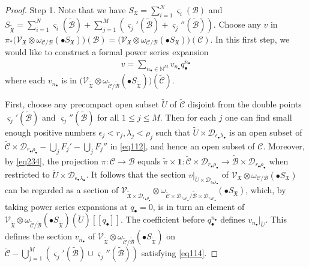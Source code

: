 \documentclass[12pt,b5paper,notitlepage]{report}
\theoremstyle{definition}
\theoremstyle{plain}
\newcommand{\fk}{\mathfrak}
\newcommand{\mc}{\mathcal}
\newcommand{\wtd}{\widetilde}
\newcommand{\id}{\mathbf{1}}
\newcommand{\scr}{\mathscr}
\newcommand{\sgm}{\varsigma}
\newcommand{\blt}{\bullet}
\newcommand{\Nbb}{\mathbb N}
\numberwithin{equation}{section}
\begin{document}
\begin{proof}
Step 1. Note that we have $S_{\fk X}=\sum_{i=1}^N\sgm_i(\mc B)$ and $S_{\wtd{\fk X}}=\sum_{i=1}^N\sgm_i(\wtd{\mc B})+\sum_{j=1}^M(\sgm_j'(\wtd{\mc B})+\sgm_j''(\wtd{\mc B}))$. Choose any $v$ in $\pi_*\big(\scr V_{\fk X}\otimes\omega_{\mc C/\mc B}(\blt S_{\fk X})\big)(\mc B)=\big(\scr V_{\fk X}\otimes\omega_{\mc C/\mc B}(\blt S_{\fk X})\big)(\mc C)$.  In this first step, we would like to construct a formal power series expansion
\begin{align}
v=\sum_{n_\blt\in\Nbb^M}v_{n_\blt}q_\blt^{n_\blt}\label{eq114}
\end{align}
where each $v_{n_\blt}$ is in $\big(\scr V_{\wtd{\fk X}}\otimes\omega_{\wtd{\mc C}/\wtd{\mc B}}(\blt S_{\wtd{\fk X}})\big)(\wtd{\mc C})$.  

First, choose any precompact open subset $\wtd U$ of $\wtd{\mc C}$ disjoint from the double points $\sgm_j'(\wtd{\mc B})$ and $\sgm_j''(\wtd{\mc B})$ for all $1\leq j\leq M$. Then for each $j$ one can find small enough positive numbers $\epsilon_j<r_j,\lambda_j<\rho_j$  such that $\wtd U\times\mc D_{\epsilon_\blt\lambda_\blt}$ is an open subset of  $\wtd {\mc C}\times\mc D_{r_\blt\rho_\blt}-\bigcup_j F_j'-\bigcup_j F_j''$ in \eqref{eq112}, and hence an open subset of $\mc C$.   Moreover, by \eqref{eq234}, the projection $\pi:\mc C\rightarrow\mc B$ equals $\wtd \pi\times \id:\wtd {\mc C}\times\mc D_{r_\blt\rho_\blt}\rightarrow \wtd{\mc B}\times \mc D_{r_\blt\rho_\blt}$ when restricted to  $\wtd U\times \mc D_{\epsilon_\blt\lambda_\blt}$. It follows that the section $v|_{\wtd U\times \mc D_{\epsilon_\blt\lambda_\blt}}$  of $\scr V_{\fk X}\otimes\omega_{\mc C/\mc B}(\blt S_{\fk X})$ can be regarded as a section of $\scr V_{\wtd{\fk X}\times\mc D_{r_\blt\rho_\blt}}\otimes\omega_{\wtd{\mc C}\times\mc D_{r_\blt\rho_\blt}/\wtd{\mc B}\times\mc D_{r_\blt\rho_\blt}}(\blt S_{\fk X})$, which, by taking power series expansions at $q_\blt=0$, is in turn an element of $\scr V_{\wtd{\fk X}}\otimes\omega_{\wtd{\mc C}/\wtd{\mc B}}(\blt S_{\wtd{\fk X}})(\wtd U)[[q_\blt]]$. The coefficient before $q_\blt^{n_\blt}$ defines $v_{n_\blt}|_{\wtd U}$. This defines the section $v_{n_\blt}$ of $\scr V_{\wtd{\fk X}}\otimes\omega_{\wtd{\mc C}/\wtd{\mc B}}(\blt S_{\wtd{\fk X}})$ on $\wtd{\mc C}-\bigcup_{j=1}^M(\sgm_j'(\wtd{\mc B})\cup \sgm_j''(\wtd{\mc B}))$ satisfying \eqref{eq114}.


\end{proof}
\end{document}
